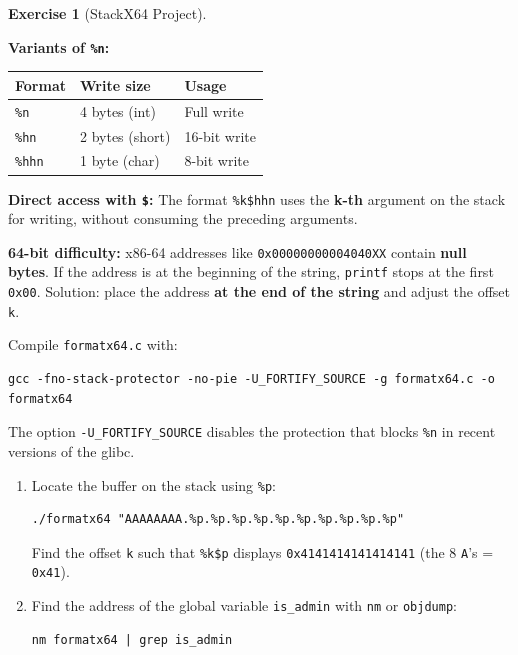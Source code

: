 \documentclass[a4paper,11pt]{article}
\theoremstyle{plain}
\theoremstyle{definition}
\newtheorem{exercice}{Exercise}
\begin{document}
\begin{exercice}[StackX64 Project]
\begin{rappel}
\medskip
\textbf{Variants of \texttt{\%n}:}
\begin{center}
\begin{tabular}{lll}
\toprule
\textbf{Format} & \textbf{Write size} & \textbf{Usage} \\
\midrule
\texttt{\%n} & 4 bytes (int) & Full write \\
\texttt{\%hn} & 2 bytes (short) & 16-bit write \\
\texttt{\%hhn} & 1 byte (char) & 8-bit write \\
\bottomrule
\end{tabular}
\end{center}

\medskip
\textbf{Direct access with \texttt{\$}:} The format \texttt{\%k\$hhn} uses the \textbf{k-th} argument on the stack for writing, without consuming the preceding arguments.

\medskip
\textbf{64-bit difficulty:} x86-64 addresses like \texttt{0x00000000004040XX} contain \textbf{null bytes}. If the address is at the beginning of the string, \texttt{printf} stops at the first \texttt{0x00}. Solution: place the address \textbf{at the end of the string} and adjust the offset \texttt{k}.
\end{rappel}

\begin{attention}
Compile \texttt{formatx64.c} with:
\begin{lstlisting}[style=GDBStyle]
gcc -fno-stack-protector -no-pie -U_FORTIFY_SOURCE -g formatx64.c -o formatx64
\end{lstlisting}
The option \texttt{-U\_FORTIFY\_SOURCE} disables the protection that blocks \texttt{\%n} in recent versions of the glibc.
\end{attention}

\begin{enumerate}
\item[\textbf{5a)}] Locate the buffer on the stack using \texttt{\%p}:
\begin{lstlisting}[style=GDBStyle]
./formatx64 "AAAAAAAA.%p.%p.%p.%p.%p.%p.%p.%p.%p.%p"
\end{lstlisting}
Find the offset \texttt{k} such that \texttt{\%k\$p} displays \texttt{0x4141414141414141} (the 8 \texttt{A}'s = \texttt{0x41}).

\item[\textbf{5b)}] Find the address of the global variable \texttt{is\_admin} with \texttt{nm} or \texttt{objdump}:
\begin{lstlisting}[style=GDBStyle]
nm formatx64 | grep is_admin
\end{lstlisting}


\end{enumerate}
\end{exercice}
\end{document}
